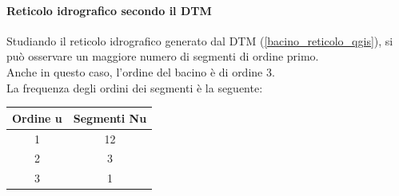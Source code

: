 \paragraph{Reticolo idrografico secondo il DTM}
Studiando il reticolo idrografico generato dal DTM (\ref{bacino_reticolo_qgis}), si può osservare un maggiore numero di segmenti di ordine primo.\\
Anche in questo caso, l'ordine del bacino è di ordine 3.\\
La frequenza degli ordini dei segmenti è la seguente:
\begin{table}[H] \centering
    \begin{tabular}{cc}
\toprule
    Ordine u & Segmenti Nu \\
\midrule    
    1        & 12          \\
    2        & 3          \\
    3        & 1           \\
\bottomrule    
\end{tabular}
\end{table}